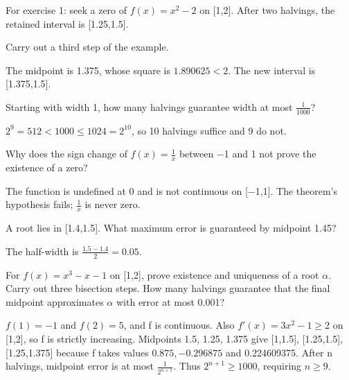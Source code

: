 \documentclass[11pt]{article}
\begin{document}
For exercise 1: seek a zero of \(f(x)=x^{2}-2\) on [1,2]. After two halvings, the retained interval is [1.25,1.5].\par
{}
Carry out a third step of the example.\par
The midpoint is 1.375, whose square is \(1.890625<2\). The new interval is [1.375,1.5].\par
{}
Starting with width 1, how many halvings guarantee width at most \(\frac{1}{1000}\)?\par
\(2^{9}=512<1000\leq 1024=2^{10}\), so 10 halvings suffice and 9 do not.\par
{}
Why does the sign change of \(f(x)=\frac{1}{x}\) between −1 and 1 not prove the existence of a zero?\par
The function is undefined at 0 and is not continuous on [−1,1]. The theorem’s hypothesis fails; \(\frac{1}{x}\) is never zero.\par
{}
A root lies in [1.4,1.5]. What maximum error is guaranteed by midpoint 1.45?\par
The half-width is \(\frac{1.5-1.4}{2}=0.05\).\par
{}
For \(f(x)=x^{3}-x-1\) on [1,2], prove existence and uniqueness of a root \(\alpha \). Carry out three bisection steps. How many halvings guarantee that the final midpoint approximates \(\alpha \) with error at most 0.001?\par
\(f(1)=-1\) and \(f(2)=5\), and f is continuous. Also \(f'(x)=3x^{2}-1\geq 2\) on [1,2], so f is strictly increasing. Midpoints 1.5, 1.25, 1.375 give [1,1.5], [1.25,1.5], [1.25,1.375] because f takes values \(0.875, -0.296875\) and 0.224609375. After n halvings, midpoint error is at most \(\frac{1}{2^{n+1}}\). Thus \(2^{n+1}\geq 1000\), requiring \(n\geq 9\).\par
\end{document}
